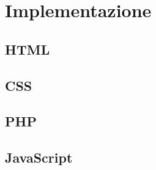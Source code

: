 \section{Implementazione}
\label{implementazione}

\subsection{HTML}
\label{implementazione-back-end-HTML}

\subsection{CSS}
\label{implementazione-front-end-CSS}

\subsection{PHP}
\label{implementazione-back-end-PHP}

\subsection{JavaScript}
\label{implementazione-front-end-JavaScript}